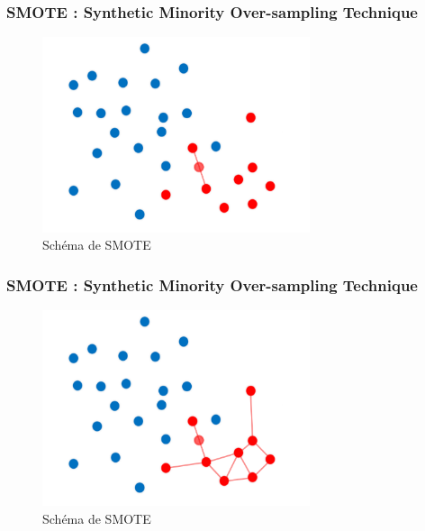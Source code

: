 \documentclass{beamer}
\begin{document}
  \begin{frame}
      \frametitle{SMOTE : Synthetic Minority Over-sampling Technique}



      \begin{figure}
          \centering
          \includegraphics[width=0.7\textwidth]{images/SMOTEC.png}
          \caption{Schéma de SMOTE}
      \end{figure}

  \end{frame}

  \begin{frame}
      \frametitle{SMOTE : Synthetic Minority Over-sampling Technique}



      \begin{figure}
          \centering
          \includegraphics[width=0.7\textwidth]{images/SMOTEB.png}
          \caption{Schéma de SMOTE}
      \end{figure}

  \end{frame}
\end{document}
